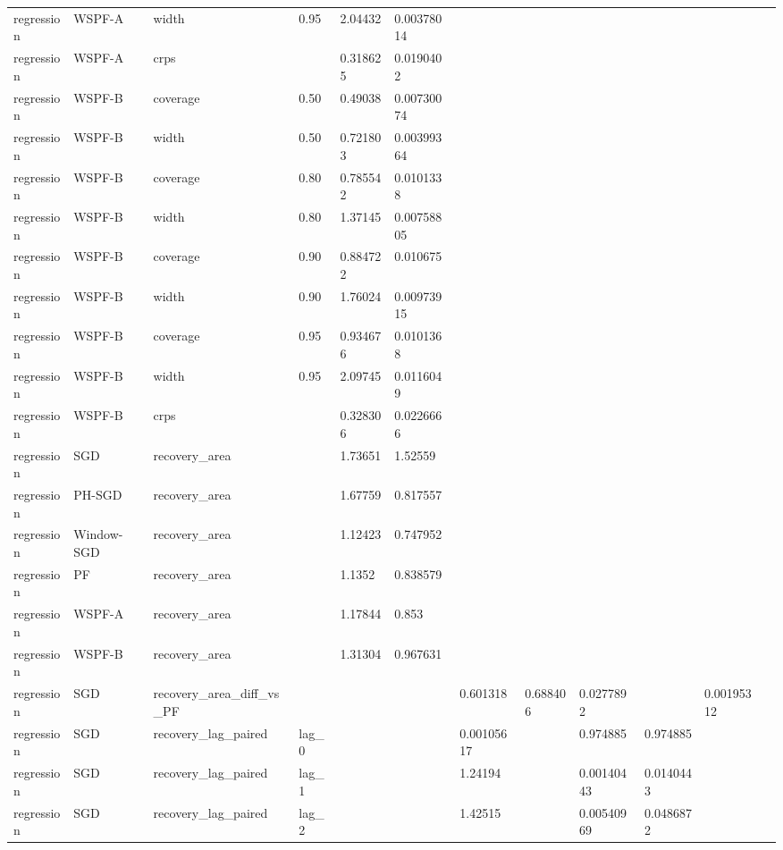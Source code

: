 \begin{tabular}{llllllllllll}
regression & WSPF-A & width & 0.95 & 2.04432 & 0.00378014 &  &  &  &  &  &  \\
regression & WSPF-A & crps &  & 0.318625 & 0.0190402 &  &  &  &  &  &  \\
regression & WSPF-B & coverage & 0.50 & 0.49038 & 0.00730074 &  &  &  &  &  &  \\
regression & WSPF-B & width & 0.50 & 0.721803 & 0.00399364 &  &  &  &  &  &  \\
regression & WSPF-B & coverage & 0.80 & 0.785542 & 0.0101338 &  &  &  &  &  &  \\
regression & WSPF-B & width & 0.80 & 1.37145 & 0.00758805 &  &  &  &  &  &  \\
regression & WSPF-B & coverage & 0.90 & 0.884722 & 0.010675 &  &  &  &  &  &  \\
regression & WSPF-B & width & 0.90 & 1.76024 & 0.00973915 &  &  &  &  &  &  \\
regression & WSPF-B & coverage & 0.95 & 0.934676 & 0.0101368 &  &  &  &  &  &  \\
regression & WSPF-B & width & 0.95 & 2.09745 & 0.0116049 &  &  &  &  &  &  \\
regression & WSPF-B & crps &  & 0.328306 & 0.0226666 &  &  &  &  &  &  \\
regression & SGD & recovery\_area &  & 1.73651 & 1.52559 &  &  &  &  &  &  \\
regression & PH-SGD & recovery\_area &  & 1.67759 & 0.817557 &  &  &  &  &  &  \\
regression & Window-SGD & recovery\_area &  & 1.12423 & 0.747952 &  &  &  &  &  &  \\
regression & PF & recovery\_area &  & 1.1352 & 0.838579 &  &  &  &  &  &  \\
regression & WSPF-A & recovery\_area &  & 1.17844 & 0.853 &  &  &  &  &  &  \\
regression & WSPF-B & recovery\_area &  & 1.31304 & 0.967631 &  &  &  &  &  &  \\
regression & SGD & recovery\_area\_diff\_vs\_PF &  &  &  & 0.601318 & 0.688406 & 0.0277892 &  & 0.00195312 &  \\
regression & SGD & recovery\_lag\_paired & lag\_0 &  &  & 0.00105617 &  & 0.974885 & 0.974885 &  &  \\
regression & SGD & recovery\_lag\_paired & lag\_1 &  &  & 1.24194 &  & 0.00140443 & 0.0140443 &  &  \\
regression & SGD & recovery\_lag\_paired & lag\_2 &  &  & 1.42515 &  & 0.00540969 & 0.0486872 &  &  \\

\end{tabular}
